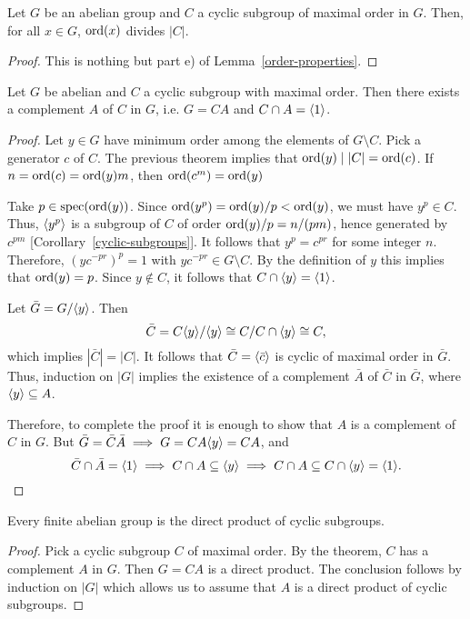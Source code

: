 \begin{thm}
    Let\/ $G$ be an abelian group and\/ $C$ a cyclic subgroup of maximal order in\/ $G$. Then, for all\/ $x \in G$,\/ ${\rm ord}(x)$ divides\/ $|C|$.
\end{thm}

\begin{proof} This is nothing but part e) of Lemma~\ref{order-properties}.  \end{proof}

\begin{thm}
    Let\/ $G$ be abelian and\/ $C$ a cyclic subgroup with maximal order. Then there exists a complement\/ $A$ of\/ $C$ in\/ $G$, i.e. $G = CA$ and\/ $C\cap A=\langle1\rangle$.
\end{thm}

\begin{proof} Let $y\in G$ have minimum order among the elements of $G\setminus C$. Pick a generator $c$ of $C$. The previous theorem implies that ${\rm ord}(y)\mid|C|={\rm ord}(c)$. If $n={\rm ord}(c)={\rm ord}(y)m$, then ${\rm ord}(c^m)={\rm ord}(y)$

Take $p\in\operatorname{spec}({\rm ord}(y))$. Since ${\rm ord}(y^p)={\rm ord}(y)/p<{\rm ord}(y)$, we must have $y^p\in C$. Thus, $\langle y^p\rangle$ is a subgroup of $C$ of order ${\rm ord}(y)/p=n/(pm)$, hence generated by $c^{pm}$ [Corollary~\ref{cyclic-subgroups}]. It follows that $y^p=c^{pr}$ for some integer $n$. Therefore, $(yc^{-pr})^p=1$ with $yc^{-pr}\in G\setminus C$. By the definition of $y$ this implies that ${\rm ord}(y)=p$. Since $y\notin C$, it follows that
$C\cap\langle y\rangle=\langle1\rangle$.

Let $\bar G=G/\langle y\rangle$. Then
$$
    \bar C= C\langle y\rangle / \langle y\rangle \cong C/C\cap\langle y\rangle\cong C,
$$
which implies $|\bar C|=|C|$. It follows that $\bar C=\langle\bar c\rangle$ is cyclic of maximal order in $\bar G$. Thus, induction on $|G|$ implies the existence of a complement $\bar A$ of $\bar C$ in $\bar G$, where $\langle y\rangle\subseteq A$.

Therefore, to complete the proof it is enough to show that $A$ is a complement of $C$ in $G$. But $\bar G=\bar C\bar A\implies G=CA\langle y\rangle=CA$, and
$$
    \bar C\cap\bar A=\langle1\rangle\implies C\cap A\subseteq\langle y\rangle
        \implies C\cap A\subseteq C\cap\langle y\rangle=\langle1\rangle.
$$
 \end{proof}

\begin{cor}\label{product-of-cyclic}
    Every finite abelian group is the direct product of cyclic subgroups.
\end{cor}

\begin{proof} Pick a cyclic subgroup $C$ of maximal order. By the theorem, $C$ has a complement $A$ in $G$. Then $G=CA$ is a direct product. The conclusion follows by induction on $|G|$ which allows us to assume that $A$ is a direct product of cyclic subgroups.  \end{proof}

